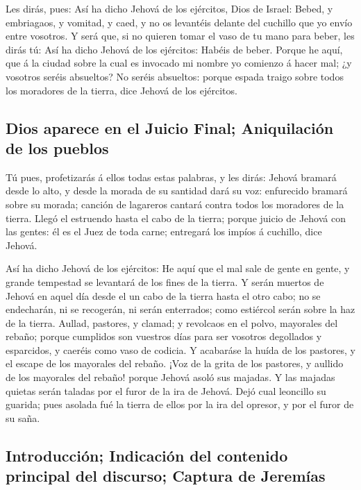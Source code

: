  Les dirás, pues: Así ha dicho Jehová de los ejércitos,
Dios de Israel: Bebed, y embriagaos, y vomitad, y caed, y no os
levantéis delante del cuchillo que yo envío entre vosotros.
 Y será que, si no quieren tomar el vaso de tu mano para
beber, les dirás tú: Así ha dicho Jehová de los ejércitos: Habéis de
beber.  Porque he aquí, que á la ciudad sobre la cual es
invocado mi nombre yo comienzo á hacer mal; ¿y vosotros seréis
absueltos? No seréis absueltos: porque espada traigo sobre todos los
moradores de la tierra, dice Jehová de los ejércitos.

\hypertarget{dios-aparece-en-el-juicio-final-aniquilaciuxf3n-de-los-pueblos}{%
\subsection{Dios aparece en el Juicio Final; Aniquilación de los
pueblos}\label{dios-aparece-en-el-juicio-final-aniquilaciuxf3n-de-los-pueblos}}

 Tú pues, profetizarás á ellos todas estas palabras, y les
dirás: Jehová bramará desde lo alto, y desde la morada de su santidad
dará su voz: enfurecido bramará sobre su morada; canción de lagareros
cantará contra todos los moradores de la tierra.  Llegó el
estruendo hasta el cabo de la tierra; porque juicio de Jehová con las
gentes: él es el Juez de toda carne; entregará los impíos á cuchillo,
dice Jehová.

 Así ha dicho Jehová de los ejércitos: He aquí que el mal
sale de gente en gente, y grande tempestad se levantará de los fines de
la tierra.  Y serán muertos de Jehová en aquel día desde el
un cabo de la tierra hasta el otro cabo; no se endecharán, ni se
recogerán, ni serán enterrados; como estiércol serán sobre la haz de la
tierra.  Aullad, pastores, y clamad; y revolcaos en el
polvo, mayorales del rebaño; porque cumplidos son vuestros días para ser
vosotros degollados y esparcidos, y caeréis como vaso de codicia.
 Y acabaráse la huída de los pastores, y el escape de los
mayorales del rebaño.  ¡Voz de la grita de los pastores, y
aullido de los mayorales del rebaño! porque Jehová asoló sus majadas.
 Y las majadas quietas serán taladas por el furor de la ira
de Jehová.  Dejó cual leoncillo su guarida; pues asolada
fué la tierra de ellos por la ira del opresor, y por el furor de su
saña.

\hypertarget{introducciuxf3n-indicaciuxf3n-del-contenido-principal-del-discurso-captura-de-jeremuxedas}{%
\subsection{Introducción; Indicación del contenido principal del
discurso; Captura de
Jeremías}\label{introducciuxf3n-indicaciuxf3n-del-contenido-principal-del-discurso-captura-de-jeremuxedas}}

